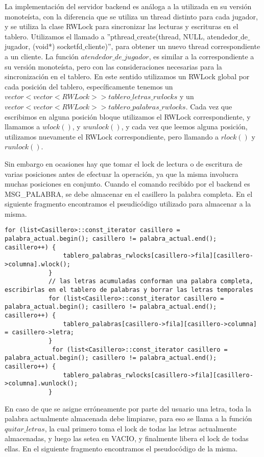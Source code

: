 La implementación del servidor backend es análoga a la utilizada en su versión monoteísta, con la diferencia que se utiliza un thread distinto para cada jugador, y se utiliza la clase RWLock para sincronizar las lecturas y escrituras en el tablero. Utilizamos el llamado a ''pthread$\_$create(thread, NULL, atendedor$\_$de$\_$jugador, (void*) socketfd$\_$cliente)'', para obtener un nuevo thread correspondiente a un cliente. La función $atendedor\_de\_jugador$, es similar a la correspondiente a su versión monoteísta, pero con las consideraciones necesarias para la sincronización en el tablero. En este sentido utilizamos un RWLock global por cada posición del tablero, específicamente tenemos un $ vector<vector<RWLock> > tablero\_letras\_rwlocks$ y un $vector<vector<RWLock> > tablero\_palabras\_rwlocks $. Cada vez que escribimos en alguna posición bloque utilizamos el RWLock correspondiente, y llamamos a $ wlock() $, y $ wunlock() $, y cada vez que leemos alguna posición, utilizamos nuevamente el RWLock correspondiente, pero llamando a $ rlock() $ y $ runlock() $.

Sin embargo en ocasiones hay que tomar el lock de lectura o de escritura de varias posiciones antes de efectuar la operación, ya que la misma involucra muchas posiciones en conjunto. Cuando el comando recibido por el backend es MSG_PALABRA, se debe almacenar en el casillero la palabra completa. En el siguiente fragmento encontramos el pseudicódigo utilizado para almacenar a la misma. 

 
\begin{lstlisting}
for (list<Casillero>::const_iterator casillero = palabra_actual.begin(); casillero != palabra_actual.end(); casillero++) {
                tablero_palabras_rwlocks[casillero->fila][casillero->columna].wlock();
            }
            // las letras acumuladas conforman una palabra completa, escribirlas en el tablero de palabras y borrar las letras temporales
            for (list<Casillero>::const_iterator casillero = palabra_actual.begin(); casillero != palabra_actual.end(); casillero++) {
                tablero_palabras[casillero->fila][casillero->columna] = casillero->letra;
            }
             for (list<Casillero>::const_iterator casillero = palabra_actual.begin(); casillero != palabra_actual.end(); casillero++) {
                tablero_palabras_rwlocks[casillero->fila][casillero->columna].wunlock();
            }
\end{lstlisting}

En caso de que se asigne erróneamente por parte del usuario una letra, toda la palabra actualmente almacenada debe limpiarse, para eso se llama a la función $ quitar\_letras $, la cual primero toma el lock de todas las letras actualmente almacenadas, y luego las setea en VACIO, y finalmente libera el lock de todas ellas.
En el siguiente fragmento encontramos el pseudocódigo de la misma. 

